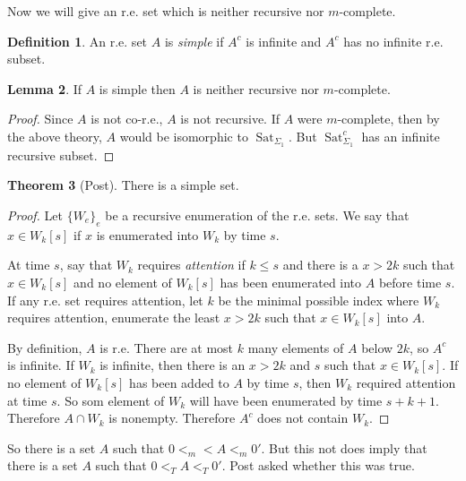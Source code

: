 \documentclass[12pt]{report}
\DeclareMathOperator{\Sat}{Sat}
\newcommand{\dfn}[1]{\emph{#1}\index{#1}}
\theoremstyle{definition}
\newtheorem{theorem}{Theorem}[chapter]
\newtheorem{lemma}[theorem]{Lemma}
\newtheorem{definition}[theorem]{Definition}
\begin{document}
Now we will give an r.e. set which is neither recursive nor $m$-complete.
\begin{definition}
An r.e. set $A$ is \dfn{simple} if $A^c$ is infinite and $A^c$ has no infinite r.e. subset.
\end{definition}
\begin{lemma}
If $A$ is simple then $A$ is neither recursive nor $m$-complete.
\end{lemma}
\begin{proof}
Since $A$ is not co-r.e., $A$ is not recursive. If $A$ were $m$-complete, then by the above theory, $A$ would be isomorphic to $\Sat_{\Sigma_1}$. But $\Sat_{\Sigma_1}^c$ has an infinite recursive subset.
\end{proof}
\begin{theorem}[Post]
There is a simple set.
\end{theorem}
\begin{proof}
Let $\{W_e\}_e$ be a recursive enumeration of the r.e. sets. We say that $x \in W_k[s]$ if $x$ is enumerated into $W_k$ by time $s$.

At time $s$, say that $W_k$ requires \dfn{attention} if $k \leq s$ and there is a $x > 2k$ such that $x \in W_k[s]$ and no element of $W_k[s]$ has been enumerated into $A$ before time $s$.
If any r.e. set requires attention, let $k$ be the minimal possible index where $W_k$ requires attention, enumerate the least $x > 2k$ such that $x \in W_k[s]$ into $A$.

By definition, $A$ is r.e. There are at most $k$ many elements of $A$ below $2k$, so $A^c$ is infinite.
If $W_k$ is infinite, then there is an $x > 2k$ and $s$ such that $x \in W_k[s]$. If no element of $W_k[s]$ has been added to $A$ by time $s$, then $W_k$ required attention at time $s$. So som element of $W_k$ will have been enumerated by time $s + k + 1$. Therefore $A \cap W_k$ is nonempty. Therefore $A^c$ does not contain $W_k$.
\end{proof}

So there is a set $A$ such that $0 <_m < A <_m 0'$. But this not does imply that there is a set $A$ such that $0 <_T A <_T 0'$. Post asked whether this was true.
\end{document}

